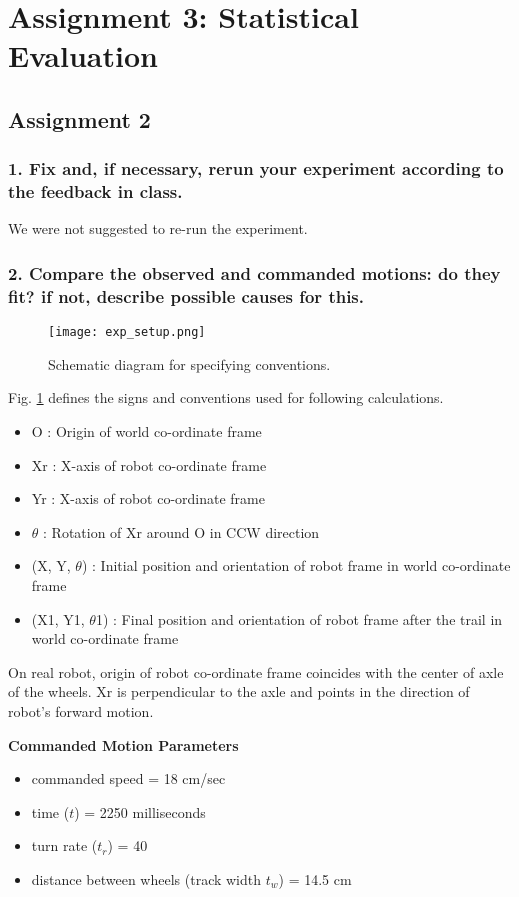 \section*{Assignment 3: Statistical Evaluation}
\subsection*{Assignment 2}
\subsubsection*{1. Fix and, if necessary, rerun your experiment according to the feedback in class.}
We were not suggested to re-run the experiment.

\subsubsection*{2. Compare the observed and commanded motions: do they fit? if not, describe possible causes for this.} 

\begin{figure}[H]
\centering
\texttt{[image: exp\_setup.png]}
\caption{Schematic diagram for specifying conventions.}
\label{schematic-convention}
\end{figure}


Fig. \ref{schematic-convention} defines the signs and conventions used for following calculations. 
\begin{itemize}
	\item O : Origin of world co-ordinate frame
	\item Xr : X-axis of robot co-ordinate frame 
	\item Yr : X-axis of robot co-ordinate frame
	\item $\theta$ : Rotation of Xr around O in CCW direction
	\item (X, Y, $\theta$) :  Initial position and orientation of robot frame in world co-ordinate frame
	\item (X1, Y1, $\theta$1) : Final position and orientation of robot frame after the trail in world co-ordinate frame
\end{itemize}

On real robot, origin of robot co-ordinate frame coincides with the center of axle of the wheels. Xr is perpendicular to the axle and points in the direction of robot's forward motion. \newline

	
\textbf{Commanded Motion Parameters}
\begin{itemize}
	\item commanded speed = 18 cm/sec
	\item time ($t$) = 2250 milliseconds
	\item turn rate ($t_r$) = 40 
	\item distance between wheels (track width $t_w$) = 14.5 cm 
\end{itemize}

